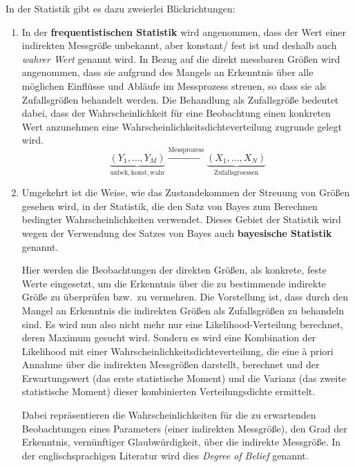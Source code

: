 In der Statistik gibt es dazu zweierlei Blickrichtungen:
\begin{enumerate}
\item In der \textbf{frequentistischen Statistik} wird angenommen,
dass der Wert einer indirekten Messgröße unbekannt, aber konstant/ fest ist und deshalb
auch \textsl{wahrer Wert} genannt wird. In Bezug auf die direkt messbaren Größen wird angenommen,
dass sie aufgrund des Mangels an Erkenntnis über alle möglichen Einflüsse und Abläufe im Messprozess
streuen, so dass sie als Zufallsgrößen behandelt werden. Die Behandlung als Zufallsgröße
bedeutet dabei, dass der Wahrscheinlichkeit für eine Beobachtung einen konkreten Wert anzunehmen eine
Wahrscheinlichkeitsdichteverteilung zugrunde gelegt wird.
\begin{equation}
\underbrace{(Y_1, \dots, Y_M)}_{\mathrm{unbek, konst, wahr}} \xrightarrow{\mathrm{Messprozess}}
\underbrace{(X_1, \dots, X_N)}_{\mathrm{Zufallsgroessen}}
\end{equation}
\item Umgekehrt ist die Weise, wie das Zustandekommen der Streuung von Größen gesehen wird,
in der Statistik, die den Satz von Bayes zum Berechnen bedingter Wahrscheinlichkeiten
verwendet. Dieses Gebiet der Statistik wird wegen der Verwendung des
Satzes von Bayes auch \textbf{bayesische Statistik} genannt.

Hier werden die Beobachtungen der direkten Größen, als konkrete, feste Werte eingesetzt,
um die Erkenntnis über die zu bestimmende indirekte Größe zu überprüfen bzw.\ zu vermehren.
Die Vorstellung ist, dass durch den Mangel an Erkenntnis die indirekten Größen als
Zufallsgrößen zu behandeln sind. Es wird nun also nicht mehr nur eine Likelihood-Verteilung
berechnet, deren Maximum gesucht wird. Sondern es wird eine Kombination der Likelihood mit
einer Wahrscheinlichkeitsdichteverteilung,
die eine {\`a} priori Annahme über die indirekten Messgrößen darstellt, berechnet und der
Erwartungswert (das erste statistische Moment) und die Varianz (das zweite statistische Moment)
dieser kombinierten Verteilungsdichte ermittelt.

Dabei repräsentieren die Wahrscheinlichkeiten für die zu erwartenden Beobachtungen eines Parameters
(einer indirekten Messgröße),
den Grad der Erkenntnis, vernünftiger Glaubwürdigkeit, über die indirekte Messgröße.
In der englischsprachigen Literatur wird dies \textsl{Degree of Belief} genannt.


\end{enumerate}
